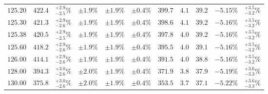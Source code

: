 \begin{table}[ht!]
{{\begin{tabular}{| cc | c | ccc | cccc | c |}
$125.20$ & $422.4$ & $^{+2.9}_{-2.5}\%$ & $\pm 1.9\%$ & {\color{black!55}$\pm 1.9\%$} & {\color{black!55}$\pm 0.4\%$} & $399.7$ & $4.1$ & $39.2$ & $-5.15\%$ & $^{+3.5}_{-3.2}\%$ \\
$125.30$ & $421.3$ & $^{+2.9}_{-2.6}\%$ & $\pm 1.9\%$ & {\color{black!55}$\pm 1.9\%$} & {\color{black!55}$\pm 0.4\%$} & $398.6$ & $4.1$ & $39.2$ & $-5.16\%$ & $^{+3.5}_{-3.2}\%$ \\
$125.38$ & $420.5$ & $^{+2.9}_{-2.5}\%$ & $\pm 1.9\%$ & {\color{black!55}$\pm 1.9\%$} & {\color{black!55}$\pm 0.4\%$} & $397.8$ & $4.0$ & $39.2$ & $-5.16\%$ & $^{+3.5}_{-3.2}\%$ \\
$125.60$ & $418.2$ & $^{+2.9}_{-2.6}\%$ & $\pm 1.9\%$ & {\color{black!55}$\pm 1.9\%$} & {\color{black!55}$\pm 0.4\%$} & $395.5$ & $4.0$ & $39.1$ & $-5.16\%$ & $^{+3.5}_{-3.2}\%$ \\
$126.00$ & $414.1$ & $^{+2.9}_{-2.6}\%$ & $\pm 1.9\%$ & {\color{black!55}$\pm 1.9\%$} & {\color{black!55}$\pm 0.4\%$} & $391.5$ & $4.0$ & $38.8$ & $-5.16\%$ & $^{+3.5}_{-3.2}\%$ \\
$128.00$ & $394.3$ & $^{+3.0}_{-2.6}\%$ & $\pm 2.0\%$ & {\color{black!55}$\pm 1.9\%$} & {\color{black!55}$\pm 0.4\%$} & $371.9$ & $3.8$ & $37.9$ & $-5.19\%$ & $^{+3.6}_{-3.3}\%$ \\
$130.00$ & $375.8$ & $^{+3.0}_{-2.6}\%$ & $\pm 2.0\%$ & {\color{black!55}$\pm 1.9\%$} & {\color{black!55}$\pm 0.4\%$} & $353.5$ & $3.7$ & $37.1$ & $-5.22\%$ & $^{+3.6}_{-3.3}\%$ \\
\cline{1-11}
\end{tabular}
}
}
\end{table}

